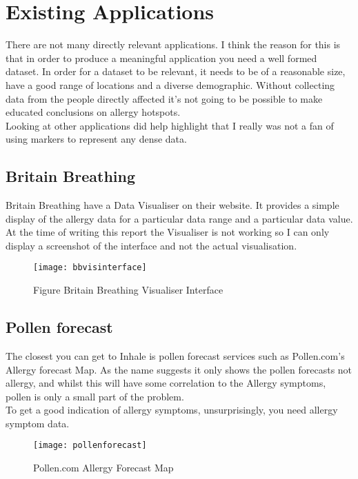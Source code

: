 \section{Existing Applications}
\label{sec:diagrams}

There are not many directly relevant applications. I think the reason for this is that in order to produce a meaningful application you need a well formed dataset. In order for a dataset to be relevant, it needs to be of a reasonable size, have a good range of locations and a diverse demographic. Without collecting data from the people directly affected it's not going to be possible to make educated conclusions on allergy hotspots.\\

Looking at other applications did help highlight that I really was not a fan of using markers to represent any dense data.



\subsection{Britain Breathing}
Britain Breathing have a Data Visualiser on their website. It provides a simple display of the allergy data for a particular data range and a particular data value. At the time of writing this report the Visualiser is not working so I can only display a screenshot of the interface and not the actual visualisation.

\begin{figure}[H]
\begin{center}
\texttt{[image: bbvisinterface]}
\caption{Figure Britain Breathing Visualiser Interface}
\end{center}
\end{figure}

\subsection{Pollen forecast}

The closest you can get to Inhale is pollen forecast services such as Pollen.com's Allergy forecast Map. As the name suggests it only shows the pollen forecasts not allergy, and whilst this will have some correlation to the Allergy symptoms, pollen is only a small part of the problem.\\

To get a good indication of allergy symptoms, unsurprisingly, you need allergy symptom data.\\

\begin{figure}[H]
\begin{center}
\texttt{[image: pollenforecast]}
\caption{Pollen.com Allergy Forecast Map}
\end{center}
\end{figure}
